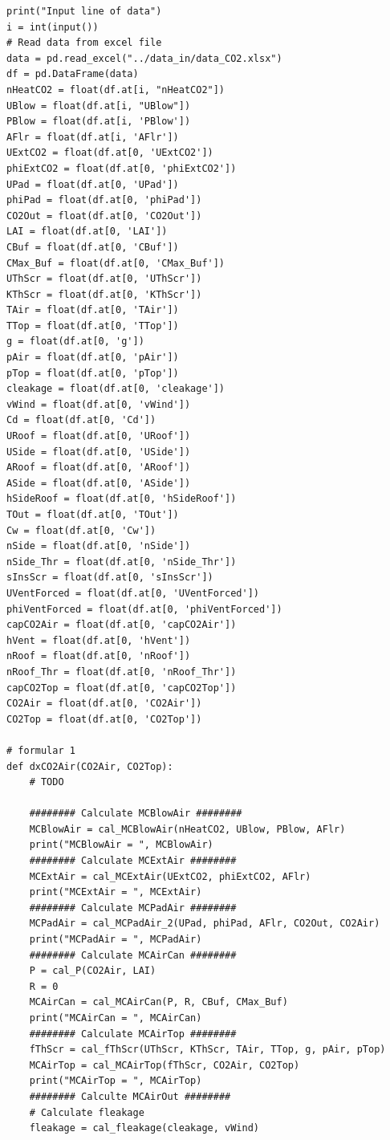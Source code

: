 \documentclass[a4paper]{article}
\begin{document}
\begin{verbatim}
print("Input line of data")
i = int(input())
# Read data from excel file
data = pd.read_excel("../data_in/data_CO2.xlsx")
df = pd.DataFrame(data)
nHeatCO2 = float(df.at[i, "nHeatCO2"])
UBlow = float(df.at[i, "UBlow"])
PBlow = float(df.at[i, 'PBlow'])
AFlr = float(df.at[i, 'AFlr'])
UExtCO2 = float(df.at[0, 'UExtCO2'])
phiExtCO2 = float(df.at[0, 'phiExtCO2'])
UPad = float(df.at[0, 'UPad'])
phiPad = float(df.at[0, 'phiPad'])
CO2Out = float(df.at[0, 'CO2Out'])
LAI = float(df.at[0, 'LAI'])
CBuf = float(df.at[0, 'CBuf'])
CMax_Buf = float(df.at[0, 'CMax_Buf'])
UThScr = float(df.at[0, 'UThScr'])
KThScr = float(df.at[0, 'KThScr'])
TAir = float(df.at[0, 'TAir'])
TTop = float(df.at[0, 'TTop'])
g = float(df.at[0, 'g'])
pAir = float(df.at[0, 'pAir'])
pTop = float(df.at[0, 'pTop'])
cleakage = float(df.at[0, 'cleakage'])
vWind = float(df.at[0, 'vWind'])
Cd = float(df.at[0, 'Cd'])
URoof = float(df.at[0, 'URoof'])
USide = float(df.at[0, 'USide'])
ARoof = float(df.at[0, 'ARoof'])
ASide = float(df.at[0, 'ASide'])
hSideRoof = float(df.at[0, 'hSideRoof'])
TOut = float(df.at[0, 'TOut'])
Cw = float(df.at[0, 'Cw'])
nSide = float(df.at[0, 'nSide'])
nSide_Thr = float(df.at[0, 'nSide_Thr'])
sInsScr = float(df.at[0, 'sInsScr'])
UVentForced = float(df.at[0, 'UVentForced'])
phiVentForced = float(df.at[0, 'phiVentForced'])
capCO2Air = float(df.at[0, 'capCO2Air'])
hVent = float(df.at[0, 'hVent'])
nRoof = float(df.at[0, 'nRoof'])
nRoof_Thr = float(df.at[0, 'nRoof_Thr'])
capCO2Top = float(df.at[0, 'capCO2Top'])
CO2Air = float(df.at[0, 'CO2Air'])
CO2Top = float(df.at[0, 'CO2Top'])

# formular 1
def dxCO2Air(CO2Air, CO2Top):
    # TODO

    ######## Calculate MCBlowAir ########
    MCBlowAir = cal_MCBlowAir(nHeatCO2, UBlow, PBlow, AFlr)
    print("MCBlowAir = ", MCBlowAir)
    ######## Calculate MCExtAir ########
    MCExtAir = cal_MCExtAir(UExtCO2, phiExtCO2, AFlr)
    print("MCExtAir = ", MCExtAir)
    ######## Calculate MCPadAir ########
    MCPadAir = cal_MCPadAir_2(UPad, phiPad, AFlr, CO2Out, CO2Air)
    print("MCPadAir = ", MCPadAir)
    ######## Calculate MCAirCan ########
    P = cal_P(CO2Air, LAI)
    R = 0
    MCAirCan = cal_MCAirCan(P, R, CBuf, CMax_Buf)
    print("MCAirCan = ", MCAirCan)
    ######## Calculate MCAirTop ########
    fThScr = cal_fThScr(UThScr, KThScr, TAir, TTop, g, pAir, pTop)
    MCAirTop = cal_MCAirTop(fThScr, CO2Air, CO2Top)
    print("MCAirTop = ", MCAirTop)
    ######## Calculte MCAirOut ########
    # Calculate fleakage
    fleakage = cal_fleakage(cleakage, vWind)


\end{verbatim}
\end{document}
